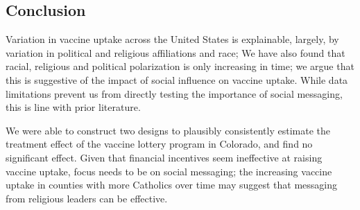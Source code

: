 \documentclass[12pt]{article}
\begin{document}
\begin{spacing}{1.5}
		\section{Conclusion}
		Variation in vaccine uptake across the United States is explainable, largely, by variation in political and religious affiliations and race; We have also found that racial, religious and political polarization is only increasing in time; we argue that this is suggestive of the impact of social influence on vaccine uptake. While data limitations prevent us from directly testing the importance of social messaging, this is line with prior literature.
		
		We were able to construct two designs to plausibly consistently estimate the treatment effect of the vaccine lottery program in Colorado, and find no significant effect. Given that financial incentives seem ineffective at raising vaccine uptake, focus needs to be on social messaging; the increasing vaccine uptake in counties with more Catholics over time may suggest that messaging from religious leaders can be effective.
		
		\pagebreak
		\printbibliography
		
	\end{spacing}
\end{document}
